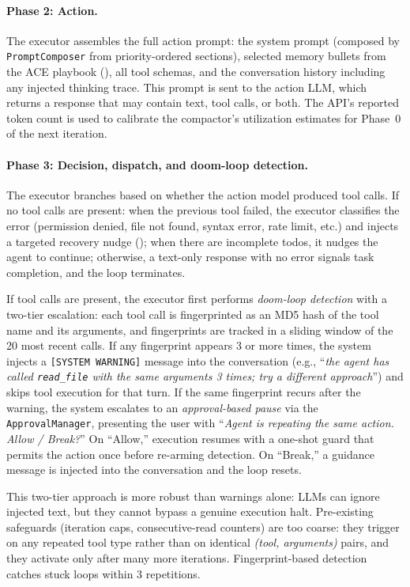 \paragraph{Phase 2: Action.} The executor assembles the full action prompt: the system prompt (composed by \texttt{PromptComposer} from priority-ordered sections), selected memory bullets from the ACE playbook (), all tool schemas, and the conversation history including any injected thinking trace. This prompt is sent to the action LLM, which returns a response that may contain text, tool calls, or both. The API's reported token count is used to calibrate the compactor's utilization estimates for Phase~0 of the next iteration.

\paragraph{Phase 3: Decision, dispatch, and doom-loop detection.} The executor branches based on whether the action model produced tool calls. If no tool calls are present: when the previous tool failed, the executor classifies the error (permission denied, file not found, syntax error, rate limit, etc.) and injects a targeted recovery nudge (); when there are incomplete todos, it nudges the agent to continue; otherwise, a text-only response with no error signals task completion, and the loop terminates.

If tool calls are present, the executor first performs \emph{doom-loop detection} with a two-tier escalation: each tool call is fingerprinted as an MD5 hash of the tool name and its arguments, and fingerprints are tracked in a sliding window of the 20 most recent calls. If any fingerprint appears 3 or more times, the system injects a \texttt{[SYSTEM WARNING]} message into the conversation (e.g., ``\emph{the agent has called \texttt{read\_file} with the same arguments 3 times; try a different approach}'') and skips tool execution for that turn. If the same fingerprint recurs after the warning, the system escalates to an \emph{approval-based pause} via the \texttt{ApprovalManager}, presenting the user with ``\emph{Agent is repeating the same action. Allow / Break?}'' On ``Allow,'' execution resumes with a one-shot guard that permits the action once before re-arming detection. On ``Break,'' a guidance message is injected into the conversation and the loop resets.

This two-tier approach is more robust than warnings alone: LLMs can ignore injected text, but they cannot bypass a genuine execution halt. Pre-existing safeguards (iteration caps, consecutive-read counters) are too coarse: they trigger on any repeated tool type rather than on identical \emph{(tool, arguments)} pairs, and they activate only after many more iterations. Fingerprint-based detection catches stuck loops within 3 repetitions.

